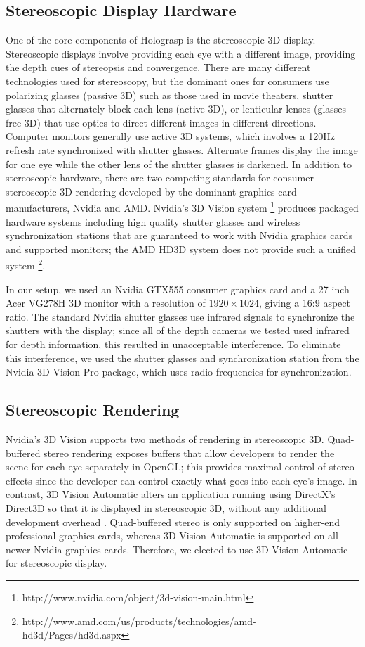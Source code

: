 \documentclass[pageno]{jpaper}
\begin{document}
\subsection{Stereoscopic Display Hardware}
One of the core components of Holograsp is the stereoscopic 3D display. Stereoscopic displays involve providing each eye with a different image, providing the
depth cues of stereopsis and convergence. There are many different technologies used for stereoscopy, but the dominant ones for consumers use polarizing glasses
(passive 3D) such as those used in movie theaters, shutter glasses that alternately block each lens (active 3D), or lenticular lenses (glasses-free 3D) that use optics 
to direct different images in different directions. Computer monitors generally use active 3D systems, which involves a 120Hz refresh rate synchronized with shutter glasses.
Alternate frames display the image for one eye while the other lens of the shutter glasses is darkened.
In addition to stereoscopic hardware, there are two competing standards for consumer stereoscopic 3D rendering 
developed by the dominant graphics card manufacturers, Nvidia and AMD. Nvidia's 3D Vision system \footnote{http://www.nvidia.com/object/3d-vision-main.html}
produces packaged hardware systems including high quality shutter glasses and wireless synchronization stations that are guaranteed to work with Nvidia
graphics cards and supported monitors; the AMD HD3D system does not provide such a unified system \footnote{http://www.amd.com/us/products/technologies/amd-hd3d/Pages/hd3d.aspx}.

In our setup, we used an Nvidia GTX555 consumer graphics card and a 27 inch Acer VG278H 3D monitor with a resolution of $1920\times 1024$, giving a 16:9 aspect ratio. 
The standard Nvidia shutter glasses use infrared
signals to synchronize the shutters with the display; since all of the depth cameras we tested used infrared for depth information, this resulted in
unacceptable interference. To eliminate this interference, we used the shutter glasses and synchronization station from the Nvidia 3D Vision Pro
package, which uses radio frequencies for synchronization.

\subsection{Stereoscopic Rendering}
Nvidia's 3D Vision supports two methods of rendering in stereoscopic 3D. Quad-buffered stereo rendering exposes buffers that allow developers to render the scene for each
eye separately in OpenGL; this provides maximal control of stereo effects since the developer can control exactly what goes into each eye's image.
In contrast, 3D Vision Automatic alters an application running using DirectX's Direct3D so that it is
displayed in stereoscopic 3D, without any additional development overhead \cite{nvidia3dvision}. Quad-buffered stereo is only supported on higher-end
professional graphics cards, whereas 3D Vision Automatic is supported on all newer Nvidia graphics cards. Therefore, we elected to use 3D Vision Automatic
for stereoscopic display.
\end{document}
